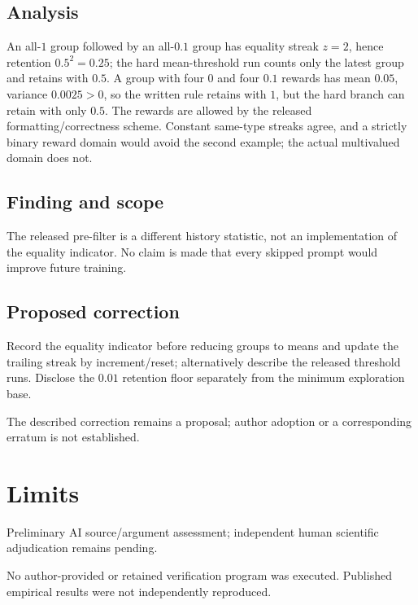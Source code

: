 \documentclass[11pt]{article}
\begin{document}
\subsection*{Analysis}

An all-\(1\) group followed by an all-\(0.1\) group has equality streak \(z=2\), hence retention \(0.5^2=0.25\); the hard mean-threshold run counts only the latest group and retains with \(0.5\). A group with four \(0\) and four \(0.1\) rewards has mean \(0.05\), variance \(0.0025>0\), so the written rule retains with \(1\), but the hard branch can retain with only \(0.5\). The rewards are allowed by the released formatting/correctness scheme. Constant same-type streaks agree, and a strictly binary reward domain would avoid the second example; the actual multivalued domain does not.

\subsection*{Finding and scope}

The released pre-filter is a different history statistic, not an implementation of the equality indicator. No claim is made that every skipped prompt would improve future training.

\subsection*{Proposed correction}

Record the equality indicator before reducing groups to means and update the trailing streak by increment/reset; alternatively describe the released threshold runs. Disclose the \(0.01\) retention floor separately from the minimum exploration base.

The described correction remains a proposal; author adoption or a corresponding erratum is not established.

\section*{Limits}

Preliminary AI source/argument assessment; independent human scientific adjudication remains pending.\par

No author-provided or retained verification program was executed. Published empirical results were not independently reproduced.\par
\end{document}
